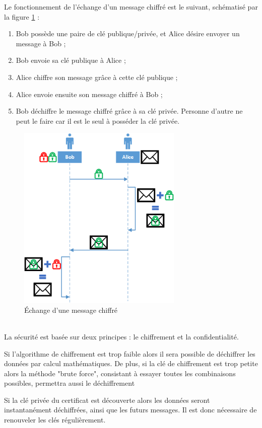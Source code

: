 Le fonctionnement de l'échange d'un message chiffré est le suivant, schématisé par la figure \ref{chiffrement} :
\begin{enumerate}
	\item Bob possède une paire de clé publique/privée, et Alice désire envoyer un message à Bob ;
	\item Bob envoie sa clé publique à Alice ;
	\item Alice chiffre son message grâce à cette clé publique ;
	\item Alice envoie ensuite son message chiffré à Bob ;
	\item Bob déchiffre le message chiffré grâce à sa clé privée. Personne d'autre ne peut le faire car il est le seul à posséder la clé privée.
\end{enumerate}
\begin{figure}[!h]
	\center
	\includegraphics[width=0.7\textwidth]{img/chiffrement.png}
	\caption{Échange d'une message chiffré}
	\label{chiffrement}
\end{figure}
~~\\

La sécurité est basée sur deux principes : le chiffrement et la confidentialité.

Si l'algorithme de chiffrement est trop faible alors il sera possible de déchiffrer les données par calcul mathématiques.
De plus, si la clé de chiffrement est trop petite alors la méthode "brute force", consistant à essayer toutes les combinaisons possibles, permettra aussi le déchiffrement

Si la clé privée du certificat est découverte alors les données seront instantanément déchiffrées, ainsi que les futurs messages.
Il est donc nécessaire de renouveler les clés régulièrement.

